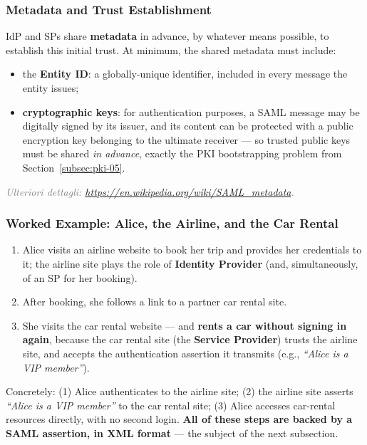 \documentclass[12pt, a4paper]{article}
\begin{document}
\subsubsection{Metadata and Trust Establishment}
IdP and SPs share \textbf{metadata} in advance, by whatever means possible, to establish this initial trust. At minimum, the shared metadata must include:
\begin{itemize}
    \item the \textbf{Entity ID}: a globally-unique identifier, included in every message the entity issues;
    \item \textbf{cryptographic keys}: for authentication purposes, a SAML message may be digitally signed by its issuer, and its content can be protected with a public encryption key belonging to the ultimate receiver --- so trusted public keys must be shared \emph{in advance}, exactly the PKI bootstrapping problem from Section~\ref{subsec:pki-05}.
\end{itemize}
\textcolor{gray}{\textit{Ulteriori dettagli: \url{https://en.wikipedia.org/wiki/SAML_metadata}.}}

\subsubsection{Worked Example: Alice, the Airline, and the Car Rental}
\begin{enumerate}
    \item Alice visits an airline website to book her trip and provides her credentials to it; the airline site plays the role of \textbf{Identity Provider} (and, simultaneously, of an SP for her booking).
    \item After booking, she follows a link to a partner car rental site.
    \item She visits the car rental website --- and \textcolor{ForestGreen!60!black}{\textbf{rents a car without signing in again}}, because the car rental site (the \textbf{Service Provider}) trusts the airline site, and accepts the authentication assertion it transmits (e.g., \textit{``Alice is a VIP member''}).
\end{enumerate}
Concretely: (1) Alice authenticates to the airline site; (2) the airline site asserts \textit{``Alice is a VIP member''} to the car rental site; (3) Alice accesses car-rental resources directly, with no second login. \textbf{All of these steps are backed by a SAML assertion, in XML format} --- the subject of the next subsection.
\end{document}
